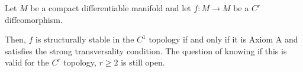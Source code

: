 \documentclass[12pt]{article}
\begin{document}
Let $M$ be a compact differentiable manifold and let $f:M\rightarrow M$ be a $C^r$ diffeomorphism.

Then, $f$ is structurally stable in the $C^1$ topology if and only if it is Axiom A and satisfies the strong transversality condition.
The question of knowing if this is valid for the $C^r$ topology, $r\geq 2$ is still open.
\end{document}
